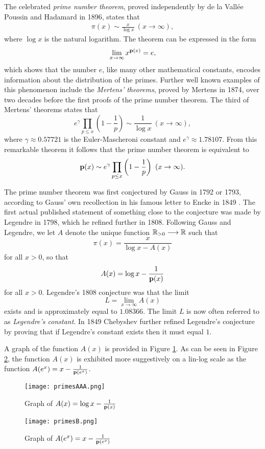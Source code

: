 \documentclass[12pt]{article}
\begin{document}
The celebrated {\it prime number theorem}, proved independently by de la Vall\'ee Poussin \cite{val1} and Hadamard \cite{had}  in 1896,  states that
\begin{align*}
\pi(x) \sim \frac{x}{\log x} \ (x \to \infty),
\end{align*}
where $\log x$ is the natural logarithm.   The theorem can be expressed in the form $$\lim_{x \to \infty} x^{{\mathbf p}(x)} = e,$$ which shows that the number $e$, like many other mathematical constants, encodes information about the distribution of the primes.    Further well known examples of this phenomenon include the {\it Mertens' theorems}, proved by Mertens in 1874, over two decades before the first proofs of the prime number theorem.  The third of Mertens' theorems states that
$$e^{\gamma} \prod_{p \leq x} \left(1-\frac{1}{p} \right)  \sim \frac{1}{\log x} \ (x \to \infty),$$ 
where $\gamma \approx 0.57721$ is the Euler-Mascheroni constant and $e^\gamma \approx 1.78107$.  From this remarkable theorem it follows that the prime number theorem is equivalent to
$${\mathbf p}(x) \sim e^\gamma \prod_{p \leq x} \left(1-\frac{1}{p} \right) \ (x \to \infty).$$ 

The prime number theorem was first conjectured by Gauss in 1792 or 1793, according to Gauss' own recollection in his famous letter to Encke in 1849  \cite{gau}. The first actual published statement of something close to the conjecture was made by Legendre in 1798, which he refined further in 1808.  Following Gauss and Legendre, we let $A$ denote the unique function ${\mathbb R}_{> 0} \longrightarrow {\mathbb R}$ such that
$$\pi(x) = \frac{x}{\log x - A(x)}$$
for all $x > 0$, so that $$A(x) = \log x - \frac{1}{{\mathbf p}(x)}$$
for all $x > 0$.     Legendre's 1808 conjecture was that the limit $$L = \lim_{x \to \infty} A(x)$$ exists and is approximately equal to $1.08366$.   The limit $L$ is now often referred to as {\it Legendre's constant}.   In 1849 Chebyshev further refined Legendre's conjecture by proving that if Legendre's constant exists then it must equal $1$.  

A graph of the function $A(x)$ is provided in Figure \ref{graphAAA}.   As can be seen in Figure \ref{graphB}, the function $A(x)$ is exhibited more suggestively on a lin-log scale as the function $A(e^x) = x-\frac{1}{{\mathbf p}(e^x)}$.  %

\begin{figure}[ht!]
\centering
\texttt{[image: primesAAA.png]}
\caption{Graph of $A(x) = \log x - \frac{1}{{\mathbf p}(x)}$  \label{graphAAA}}
\end{figure}
\begin{figure}[ht!]
\centering
\texttt{[image: primesB.png]}
\caption{Graph of $A(e^x) = x - \frac{1}{{\mathbf p}(e^x)}$  \label{graphB}}
\end{figure}
\end{document}
